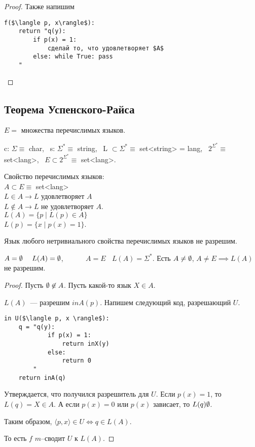 \begin{proof}
    Также напишим
\begin{lstlisting}[mathescape=true]
f($\langle p, x\rangle$):
    return "q(y):
        if p(x) = 1:
            сделай то, что удовлетворяет $A$
        else: while True: pass
    "
\end{lstlisting}
\end{proof}

\subsection{Теорема Успенского-Райса}
$E = $ множества перечислимых языков.

c: $\Sigma \equiv $ char,~ s: $\Sigma^* \equiv $ string,~
L $\subset \Sigma^* \equiv $ set<string> = lang,~
$2^{\Sigma^*} \equiv $ set<lang>,~
$E \subset 2^{\Sigma^*} \equiv $ set<lang>.

Свойство перечислимых языков:\\
$A \subset E \equiv $ set<lang>\\
$L \in A \to L $ удовлетворяет $A$\\
$L \not\in A \to L$ не удовлетворяет $A$.\\
$L(A) = \{ p \mid L(p) \in A\}$\\
$L(p) = \{ x \mid p(x) =1 \}$.

\begin{theorem}
    Язык любого нетривиального свойства перечислимых языков не разрешим.

    $A = \emptyset~~~~L(A) = \emptyset$, ~~~~~ $A = E ~~~~ L(A) = \Sigma^{*}$.
    Есть $A\neq \emptyset$, $A \neq E \implies L(A) $ не разрешим.
\end{theorem}

\begin{proof}
    Пусть $\emptyset \not\in A$.
    Пусть какой-то язык $X \in A$.

    $L(A)$~--- разрешим $in A(p)$. Напишем следующий код, разрешающий $U$.
\begin{lstlisting}[mathescape=true]
in U($\langle p, x \rangle$):
    q = "q(y):
            if p(x) = 1:
                return inX(y)
            else:
                return 0
        "
    return inA(q)
\end{lstlisting}
Утверждается, что получился разрешитель для $U$.
Если $p(x) = 1$, то $L(q) = X \in A$.
А если $p(x) = 0$ или $p(x)$ зависает, то $L(q) \emptyset$.

Таким образом, $\langle p, x \rangle \in U \iff q \in L(A)$.

То есть $f$ $m$--сводит $U$ к $L(A)$.
\end{proof}
